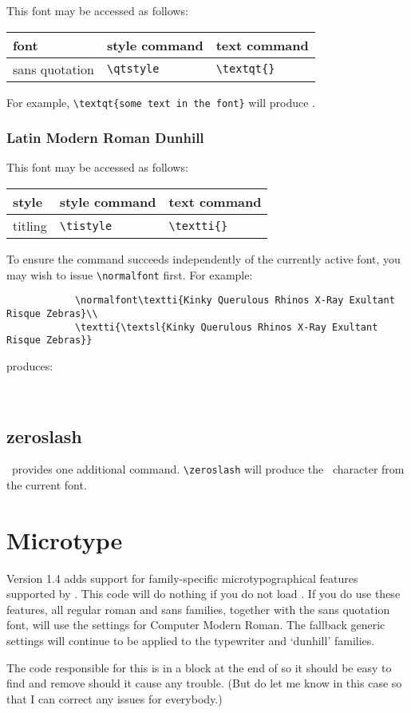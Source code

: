 \documentclass[11pt,british,a4paper]{article}
\begin{document}
This font may be accessed as follows:
	\begin{longtable}{lll}
		\toprule
		\textbf{font}			&	\textbf{style command}	&	\textbf{text command}\\\midrule\endhead
		\bottomrule\endfoot
		sans quotation			&	\verb|\qtstyle|					&	\verb|\textqt{}|
	\end{longtable}

For example, \verb|\textqt{some text in the font}| will produce .

\subsubsection{Latin Modern Roman Dunhill}

This font may be accessed as follows:
	\begin{longtable}{lll}
		\toprule
		\textbf{style}			&	\textbf{style command}	&	\textbf{text command}\\\midrule\endhead
		\bottomrule\endfoot
		titling							&	\verb|\tistyle|						&	\verb|\textti{}|\\
	\end{longtable}

To ensure the command succeeds independently of the currently active font, you may wish to issue \verb|\normalfont| first. For example:
		\begin{verbatim}
			\normalfont\textti{Kinky Querulous Rhinos X-Ray Exultant Risque Zebras}\\
			\textti{\textsl{Kinky Querulous Rhinos X-Ray Exultant Risque Zebras}}
		\end{verbatim}
		produces:
		\begin{center}
		 	\normalfont{}\\
		\end{center}

\subsection{zeroslash}

\ provides one additional command. \verb|\zeroslash| will produce the \zeroslash\ character from the current font.

\section{Microtype}\label{sec:mt}

Version 1.4 adds support for family-specific microtypographical features supported by . This code will do nothing if you do not load . If you do use these features, all regular roman and sans families, together with the sans quotation font, will use the settings for Computer Modern Roman. The fallback generic settings will continue to be applied to the typewriter and ‘dunhill’ families.

The code responsible for this is in a block at the end of  so it should be easy to find and remove should it cause any trouble. (But do let me know in this case so that I can correct any issues for everybody.)
\end{document}

